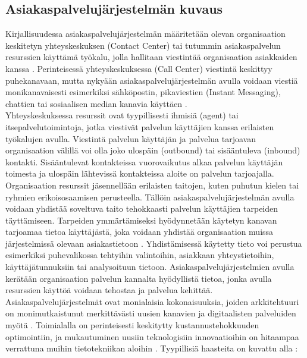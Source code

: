 \documentclass[finnish,12pt,a4paper,pdftex]{article}
\begin{document}
\subsection{Asiakaspalvelujärjestelmän kuvaus}

Kirjallisuudessa asiakaspalvelujärjestelmän määritetään olevan organisaation keskitetyn yhteyskeskuksen (Contact Center) tai tutummin asiakaspalvelun resurssien käyttämä työkalu, jolla hallitaan viestintää organisaation asiakkaiden kanssa \citep{ccinfo, cisco}. Perinteisessä yhteyskeskuksessa (Call Center) viestintä keskittyy puhekanavaan, mutta nykyään asiakaspalvelujärjestelmän avulla voidaan viestiä monikanavaisesti esimerkiksi sähköpostin, pikaviestien (Instant Messaging), chattien tai sosiaalisen median kanavia käyttäen \citep{bernier, latvakoivisto}. \\

Yhteyskeskuksessa resurssit ovat tyypillisesti ihmisiä (agent) tai itsepalvelutoimintoja, jotka viestivät palvelun käyttäjien kanssa erilaisten työkalujen avulla. Viestintä palvelun käyttäjän ja palvelua tarjoavan organisaation välillä voi olla joko ulospäin (outbound) tai sisääntuleva (inbound) kontakti. Sisääntulevat kontakteissa vuorovaikutus alkaa palvelun käyttäjän toimesta ja ulospäin lähtevissä kontakteissa aloite on palvelun tarjoajalla.  \citep{ccinfo} \\

Organisaation resurssit jäsennellään erilaisten taitojen, kuten puhutun kielen tai ryhmien erikoisosaamisen perusteella\citep{cisco}. Tällöin asiakaspalvelujärjestelmän avulla voidaan yhdistää soveltuva taito tehokkaasti palvelun käyttäjien tarpeiden täyttämiseen. Tarpeiden ymmärtämiseksi hyödynnetään käytetyn kanavan tarjoamaa tietoa käyttäjästä, joka voidaan yhdistää organisaation muissa järjestelmissä olevaan asiakastietoon \citep{ccinfo}. Yhdistämisessä käytetty tieto voi perustua esimerkiksi puhevalikossa tehtyihin valintoihin, asiakkaan yhteystietoihin, käyttäjätunnuksiin tai analysoituun tietoon. Asiakaspalvelujärjestelmien avulla kerätään organisaation palvelun kannalta hyödyllistä tietoa, jonka avulla resurssien käyttöä voidaan tehostaa ja palvelua kehittää.\\

Asiakaspalvelujärjestelmät ovat monialaisia kokonaisuuksia, joiden arkkitehtuuri on monimutkaistunut merkittävästi uusien kanavien ja digitaalisten palveluiden myötä \citep{ccgartner}. Toimialalla on perinteisesti keskitytty kustannustehokkuuden optimointiin, ja mukautuminen uusiin teknologisiin innovaatioihin on hitaampaa verrattuna muihin tietotekniikan aloihin \citep{ccvarkey}. Tyypillisiä haasteita on kuvattu alla \citep{ccvissan}:
\end{document}
